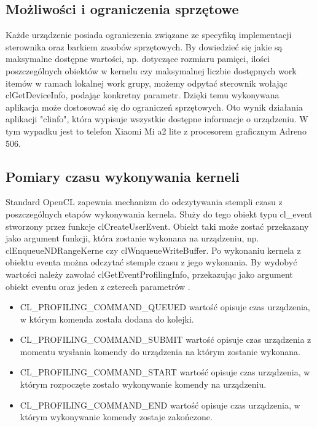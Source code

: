 \subsection{Możliwości i ograniczenia sprzętowe}
Każde urządzenie posiada ograniczenia związane ze specyfiką implementacji sterownika oraz barkiem zasobów sprzętowych. By dowiedzieć się jakie są maksymalne dostępne wartości, np. dotyczące rozmiaru pamięci, ilości poszczególnych obiektów w kernelu czy maksymalnej liczbie dostępnych work itemów w ramach lokalnej work grupy, możemy odpytać sterownik wołając clGetDeviceInfo, podając konkretny parametr. Dzięki temu wykonywana aplikacja może dostosować się do ograniczeń sprzętowych. Oto wynik działania aplikacji "clinfo", która wypisuje wszystkie dostępne informacje o urządzeniu. W tym wypadku jest to telefon Xiaomi Mi a2 lite z procesorem graficznym Adreno 506.
 
 \subsection{Pomiary czasu wykonywania kerneli}
 Standard OpenCL zapewnia mechanizm do odczytywania stempli czasu z poszczególnych etapów wykonywania kernela. Służy do tego obiekt typu cl\_event stworzony przez funkcje clCreateUserEvent. Obiekt taki może zostać przekazany jako argument funkcji, która zostanie wykonana na urządzeniu, np. clEnqueueNDRangeKerne czy clWnqueueWriteBuffer.
 Po wykonaniu kernela z obiektu eventa można odczytać stemple czasu z jego wykonania. By wydobyć wartości należy zawołać clGetEventProfilingInfo, przekazując jako argument obiekt eventu oraz jeden z czterech parametrów .
 \begin{itemize}
     \item CL\_PROFILING\_COMMAND\_QUEUED wartość opisuje czas urządzenia, w którym komenda została dodana do kolejki.
     \item CL\_PROFILING\_COMMAND\_SUBMIT wartość opisuje czas urządzenia z momentu wysłania komendy do urządzenia na którym zostanie wykonana.
     \item CL\_PROFILING\_COMMAND\_START wartość opisuje czas urządzenia, w którym rozpoczęte zostało wykonywanie komendy na urządzeniu.
     \item CL\_PROFILING\_COMMAND\_END wartość opisuje czas urządzenia, w którym wykonywanie komendy zostaje zakończone.
\end{itemize}
